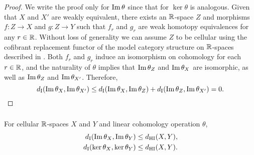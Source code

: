 \begin{proof}
	We write the proof only for $\operatorname{Im}\theta$ since that for $\ker\theta$ is analogous.
	Given that $X$ and $X'$ are weakly equivalent, there exists an $\mathbb{R}$-space $Z$ and morphisms $f \colon Z \to X$ and $g \colon Z \to Y$ such that $f_r$ and $g_r$ are weak homotopy equivalences for any $r \in \mathbb{R}$.
	Without loss of generality we can assume $Z$ to be cellular using the cofibrant replacement functor of the model category structure on $\mathbb{R}$-spaces described in \cite{blumberg2023interleaving}.
    Both $f_r$ and $g_r$ induce an isomorphism on cohomology for each $r \in \mathbb{R}$, and the naturality of $\theta$ implies that $\operatorname{Im}\theta_{Z}$ and $\operatorname{Im}\theta_{X}$ are isomorphic, as well as $\operatorname{Im}\theta_{Z}$ and $\operatorname{Im}\theta_{X'}$.
	Therefore,
	\[
	d_{\mathrm{I}}(\operatorname{Im}\theta_{X},\operatorname{Im}\theta_{X'}) \leq
	d_{\mathrm{I}}(\operatorname{Im}\theta_{X},\operatorname{Im}\theta_{Z}) + d_{\mathrm{I}}(\operatorname{Im}\theta_{Z},\operatorname{Im}\theta_{X'}) =
	0.\qedhere
	\]
\end{proof}

\subsubsection{}\label{thm:theta stability}

\theorem
For cellular $\mathbb{R}$-spaces $X$ and $Y$ and linear cohomology operation $\theta$,
\begin{align*}
	d_{\mathrm{I}}(\operatorname{Im}\theta_{X}, \operatorname{Im}\theta_{Y}) &\leq d_{\mathrm{HI}}(X,Y), \\
	d_{\mathrm{I}}(\ker\theta_{X}, \ker\theta_{Y}) &\leq d_{\mathrm{HI}}(X,Y).
\end{align*}

